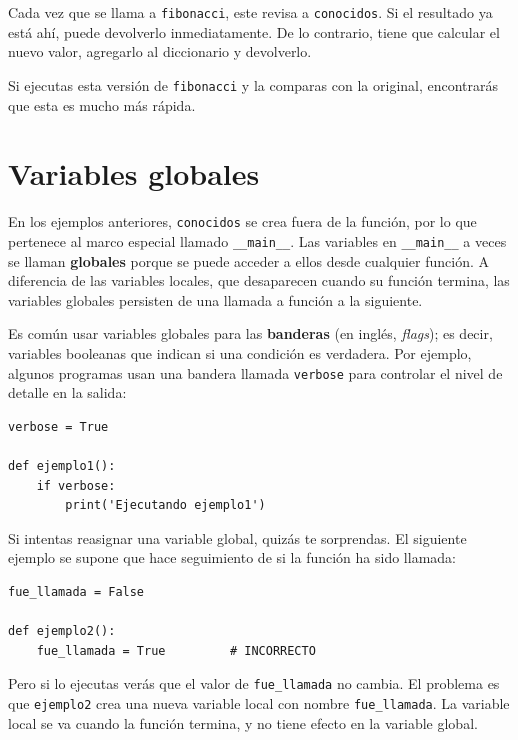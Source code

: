 \documentclass[10pt]{book}
\begin{document}
Cada vez que se llama a {\tt fibonacci}, este revisa a {\tt conocidos}.
Si el resultado ya está ahí, puede devolverlo
inmediatamente.  De lo contrario, tiene que
calcular el nuevo valor, agregarlo al diccionario y devolverlo.

Si ejecutas esta versión de {\tt fibonacci} y la comparas con
la original, encontrarás que esta es mucho más rápida.



\section{Variables globales}

En los ejemplos anteriores, {\tt conocidos} se crea fuera de la función,
por lo que pertenece al marco especial llamado \verb"__main__".
Las variables en \verb"__main__" a veces se llaman {\bf globales}
porque se puede acceder a ellos desde cualquier función.  A diferencia de las variables
locales, que desaparecen cuando su función termina, las variables globales 
persisten de una llamada a función a la siguiente.

Es común usar variables globales para las {\bf banderas} (en inglés, {\em flags}); es decir,
variables booleanas que indican si una condición
es verdadera.  Por ejemplo, algunos programas usan
una bandera llamada {\tt verbose} para controlar el nivel de detalle en la
salida:

\begin{verbatim}
verbose = True

def ejemplo1():
    if verbose:
        print('Ejecutando ejemplo1')
\end{verbatim}
%
Si intentas reasignar una variable global, quizás te sorprendas.
El siguiente ejemplo se supone que hace seguimiento de si la
función ha sido llamada:

\begin{verbatim}
fue_llamada = False

def ejemplo2():
    fue_llamada = True         # INCORRECTO 
\end{verbatim} 
% 
Pero si lo ejecutas verás que el valor de \verb"fue_llamada"
no cambia. El problema es que {\tt ejemplo2} crea una nueva variable local
con nombre \verb"fue_llamada".  La variable local se va cuando 
la función termina, y no tiene efecto en la variable global.
\end{document}
